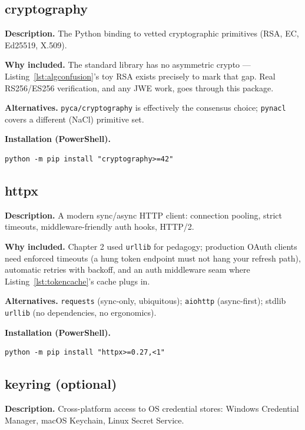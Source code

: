 \subsection{cryptography}

\textbf{Description.} The Python binding to vetted cryptographic primitives
(RSA, EC, Ed25519, X.509).

\textbf{Why included.} The standard library has no asymmetric crypto ---
Listing~\ref{lst:algconfusion}'s toy RSA exists precisely to mark that gap.
Real RS256/ES256 verification, and any JWE work, goes through this package.

\textbf{Alternatives.} \texttt{pyca/cryptography} is effectively the
consensus choice; \texttt{pynacl} covers a different (NaCl) primitive set.

\textbf{Installation (PowerShell).}
\begin{verbatim}
python -m pip install "cryptography>=42"
\end{verbatim}

\subsection{httpx}

\textbf{Description.} A modern sync/async HTTP client: connection pooling,
strict timeouts, middleware-friendly auth hooks, HTTP/2.

\textbf{Why included.} Chapter 2 used \texttt{urllib} for pedagogy;
production OAuth clients need enforced timeouts (a hung token endpoint must
not hang your refresh path), automatic retries with backoff, and an auth
middleware seam where Listing~\ref{lst:tokencache}'s cache plugs in.

\textbf{Alternatives.} \texttt{requests} (sync-only, ubiquitous);
\texttt{aiohttp} (async-first); stdlib \texttt{urllib} (no dependencies, no
ergonomics).

\textbf{Installation (PowerShell).}
\begin{verbatim}
python -m pip install "httpx>=0.27,<1"
\end{verbatim}

\subsection{keyring (optional)}

\textbf{Description.} Cross-platform access to OS credential stores:
Windows Credential Manager, macOS Keychain, Linux Secret Service.

